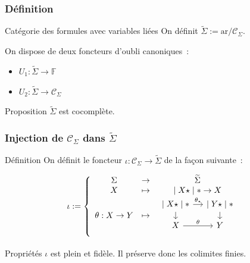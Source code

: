 \documentclass[12pt]{beamer}
\newcommand\arf{\text{ar}}
\renewcommand\C{\mathscr{C}}
\newcommand{\cf}{\mathbb{F}}
\newcommand{\tsigma}{\widetilde{\Sigma}}
\begin{document}
\begin{frame}
    \frametitle{Définition}

    \begin{block}{Catégorie des formules avec variables liées}
        On définit $\tsigma := \arf/\C_\Sigma$.

        On dispose de deux foncteurs d'oubli canoniques~:\begin{itemize}
            \item $U_1 : \tsigma\rightarrow\cf$
            \item $U_2 : \tsigma\rightarrow\C_\Sigma$
        \end{itemize}
    \end{block}
    \pause
    \begin{exampleblock}{Proposition}
        $\tsigma$ est cocomplète.
    \end{exampleblock}
\end{frame}

\begin{frame}
    \frametitle{Injection de $\C_\Sigma$ dans $\tsigma$}

    \begin{block}{Définition}
        On définit le foncteur $\iota:\C_\Sigma\rightarrow\tsigma$ de la façon suivante~:

        \[ \iota := \left\{\begin{array}{ccc}
            \Sigma & \rightarrow & \tsigma \\
            X      & \mapsto     & \mid X\star\mid\ast\rightarrow X \\
            \theta : X\rightarrow Y & \mapsto &
                \begin{tikzcd}[ampersand replacement=\&, row sep=small, column sep=small]
                    \mid X\star\mid\ast\arrow[d]
                                       \arrow[r, "\theta_\star"]
                        \& \mid Y\star\mid\ast\arrow[d] \\
                    X\arrow[r, "\theta"]
                        \& Y \\
                \end{tikzcd} \\
        \end{array}\right. \]
    \end{block}
    \pause
    \begin{exampleblock}{Propriétés}
        $\iota$ est plein et fidèle. Il préserve donc les colimites finies.
    \end{exampleblock}
\end{frame}
\end{document}
